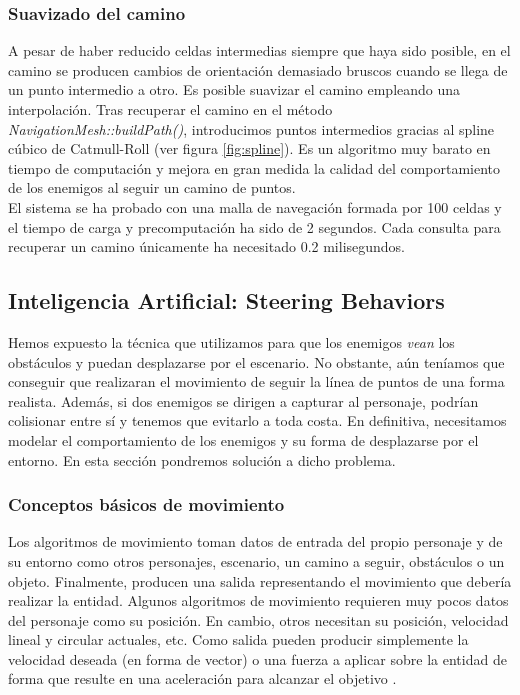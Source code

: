 \subsubsection{Suavizado del camino}


A pesar de haber reducido celdas intermedias siempre que haya sido posible,
en el camino se producen cambios de orientación demasiado bruscos cuando
se llega de un punto intermedio a otro. Es posible suavizar el camino
empleando una interpolación. Tras recuperar el camino en el método
\textit{NavigationMesh::buildPath()}, introducimos puntos intermedios
gracias al spline cúbico de Catmull-Roll \cite{website:spline} (ver figura \ref{fig:spline}).
Es un algoritmo muy barato en tiempo de computación y mejora en gran
medida la calidad del comportamiento de los enemigos al seguir un camino de puntos.\\

El sistema se ha probado con una malla de navegación formada por 100 celdas
y el tiempo de carga y precomputación ha sido de 2 segundos. Cada consulta
para recuperar un camino únicamente ha necesitado 0.2 milisegundos.\\



\subsection{Inteligencia Artificial: Steering Behaviors}
\label{sec:steering}

Hemos expuesto la técnica que utilizamos para que los enemigos \textit{vean}
los obstáculos y puedan desplazarse por el escenario. No obstante, aún
teníamos que conseguir que realizaran el movimiento de seguir la línea de puntos
de una forma realista. Además, si dos enemigos se dirigen a capturar al personaje,
podrían colisionar entre sí y tenemos que evitarlo a toda costa. En definitiva,
necesitamos modelar el comportamiento de los enemigos y su forma de desplazarse
por el entorno. En esta sección pondremos solución a dicho problema.\\

\subsubsection{Conceptos básicos de movimiento}

Los algoritmos de movimiento toman datos de entrada del propio personaje y de
su entorno como otros personajes, escenario, un camino a seguir, obstáculos
o un objeto. Finalmente, producen una salida representando el movimiento que debería
realizar la entidad.
Algunos algoritmos de movimiento requieren muy pocos datos del personaje
como su posición. En cambio, otros necesitan su posición, velocidad lineal
y circular actuales, etc. Como salida pueden producir simplemente la velocidad
deseada (en forma de vector) o una fuerza a aplicar sobre la entidad
de forma que resulte en una aceleración para alcanzar el objetivo \cite{mill09}.\\

